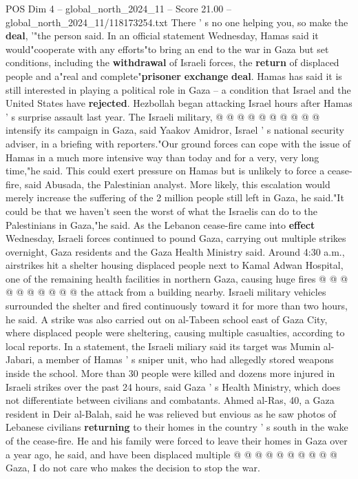\begin{textsample}{POS Dim 4 – global\_north\_2024\_11 – Score 21.00 – global\_north\_2024\_11/118173254.txt}
There ' s no one helping you, so make the \textbf{deal}, '"the person said.
In an official statement Wednesday, Hamas said it would"cooperate with any efforts"to bring an end to the war in Gaza but set conditions, including the \textbf{withdrawal} of Israeli forces, the \textbf{return} of displaced people and a"real and complete"\textbf{prisoner} \textbf{exchange} \textbf{deal}.
Hamas has said it is still interested in playing a political role in Gaza -- a condition that Israel and the United States have \textbf{rejected}.
Hezbollah began attacking Israel hours after Hamas ' s surprise assault last year.
The Israeli military, @ @ @ @ @ @ @ @ @ @ intensify its campaign in Gaza, said Yaakov Amidror, Israel ' s national security adviser, in a briefing with reporters."Our ground forces can cope with the issue of Hamas in a much more intensive way than today and for a very, very long time,"he said.
This could exert pressure on Hamas but is unlikely to force a cease-fire, said Abusada, the Palestinian analyst.
More likely, this escalation would merely increase the suffering of the 2 million people still left in Gaza, he said."It could be that we haven't seen the worst of what the Israelis can do to the Palestinians in Gaza,"he said.
As the Lebanon cease-fire came into \textbf{effect} Wednesday, Israeli forces continued to pound Gaza, carrying out multiple strikes overnight, Gaza residents and the Gaza Health Ministry said.
Around 4:30 a.m., airstrikes hit a shelter housing displaced people next to Kamal Adwan Hospital, one of the remaining health facilities in northern Gaza, causing huge fires @ @ @ @ @ @ @ @ @ @ the attack from a building nearby.
Israeli military vehicles surrounded the shelter and fired continuously toward it for more than two hours, he said.
A strike was also carried out on al-Tabeen school east of Gaza City, where displaced people were sheltering, causing multiple casualties, according to local reports.
In a statement, the Israeli miliary said its target was Mumin al-Jabari, a member of Hamas ' s sniper unit, who had allegedly stored weapons inside the school.
More than 30 people were killed and dozens more injured in Israeli strikes over the past 24 hours, said Gaza ' s Health Ministry, which does not differentiate between civilians and combatants.
Ahmed al-Ras, 40, a Gaza resident in Deir al-Balah, said he was relieved but envious as he saw photos of Lebanese civilians \textbf{returning} to their homes in the country ' s south in the wake of the cease-fire.
He and his family were forced to leave their homes in Gaza over a year ago, he said, and have been displaced multiple @ @ @ @ @ @ @ @ @ @ Gaza, I do not care who makes the decision to stop the war.

\end{textsample}
